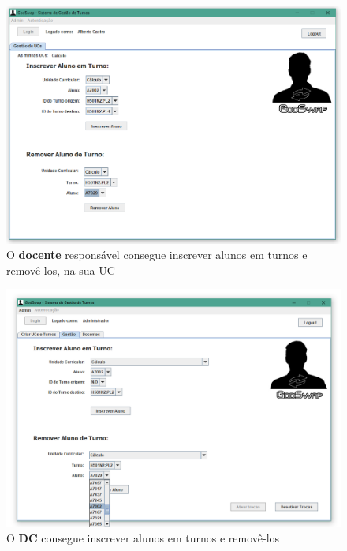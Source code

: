 \documentclass[a4paper]{article}
\begin{document}
\begin{figure}[H]
\centering
\includegraphics[width=13.5cm]{IgestaoDOCENTE}
\caption{O \textbf{docente} responsável consegue inscrever alunos em turnos e removê-los, na sua UC}
\label{}
\end{figure}

\begin{figure}[H]
\centering
\includegraphics[width=13.5cm]{IgestaoADMIN}
\caption{O \textbf{DC} consegue inscrever alunos em turnos e removê-los}
\label{}
\end{figure}
\end{document}
